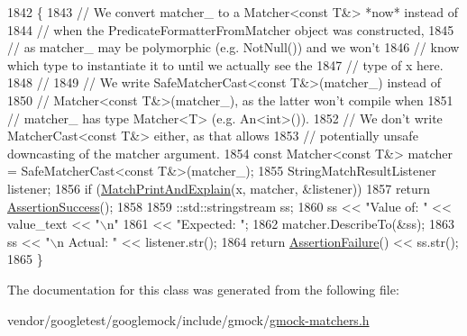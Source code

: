 \begin{DoxyCode}
1842                                                                        \{
1843     \textcolor{comment}{// We convert matcher\_ to a Matcher<const T&> *now* instead of}
1844     \textcolor{comment}{// when the PredicateFormatterFromMatcher object was constructed,}
1845     \textcolor{comment}{// as matcher\_ may be polymorphic (e.g. NotNull()) and we won't}
1846     \textcolor{comment}{// know which type to instantiate it to until we actually see the}
1847     \textcolor{comment}{// type of x here.}
1848     \textcolor{comment}{//}
1849     \textcolor{comment}{// We write SafeMatcherCast<const T&>(matcher\_) instead of}
1850     \textcolor{comment}{// Matcher<const T&>(matcher\_), as the latter won't compile when}
1851     \textcolor{comment}{// matcher\_ has type Matcher<T> (e.g. An<int>()).}
1852     \textcolor{comment}{// We don't write MatcherCast<const T&> either, as that allows}
1853     \textcolor{comment}{// potentially unsafe downcasting of the matcher argument.}
1854     \textcolor{keyword}{const} Matcher<const T&> matcher = SafeMatcherCast<const T&>(matcher\_);
1855     StringMatchResultListener listener;
1856     \textcolor{keywordflow}{if} (\hyperlink{namespacetesting_1_1internal_a0821df2611d54c79bac990719ad8a2dd}{MatchPrintAndExplain}(x, matcher, &listener))
1857       \textcolor{keywordflow}{return} \hyperlink{namespacetesting_ac1d0baedb17286c5c6c87bd1a45da8ac}{AssertionSuccess}();
1858 
1859     ::std::stringstream ss;
1860     ss << \textcolor{stringliteral}{"Value of: "} << value\_text << \textcolor{stringliteral}{"\(\backslash\)n"}
1861        << \textcolor{stringliteral}{"Expected: "};
1862     matcher.DescribeTo(&ss);
1863     ss << \textcolor{stringliteral}{"\(\backslash\)n  Actual: "} << listener.str();
1864     \textcolor{keywordflow}{return} \hyperlink{namespacetesting_a75cb789614cb1c28c34627a4a3c053df}{AssertionFailure}() << ss.str();
1865   \}
\end{DoxyCode}


The documentation for this class was generated from the following file\+:\begin{DoxyCompactItemize}
\item 
vendor/googletest/googlemock/include/gmock/\hyperlink{gmock-matchers_8h}{gmock-\/matchers.\+h}\end{DoxyCompactItemize}
